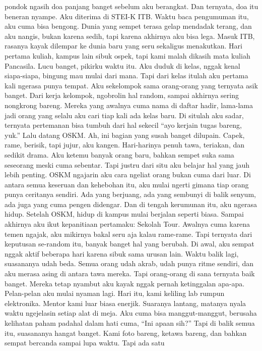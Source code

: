 \documentclass[
  letterpaper,
  DIV=11,
  numbers=noendperiod]{scrreprt}
\begin{document}
pondok ngasih doa panjang banget sebelum aku berangkat. Dan ternyata,
doa itu beneran nyampe. Aku diterima di STEI-K ITB. Waktu baca
pengumuman itu, aku cuma bisa bengong. Dunia yang sempet terasa gelap
mendadak terang, dan aku nangis, bukan karena sedih, tapi karena
akhirnya aku bisa lega. Masuk ITB, rasanya kayak dilempar ke dunia baru
yang seru sekaligus menakutkan. Hari pertama kuliah, kampus lain sibuk
ospek, tapi kami malah dikasih mata kuliah Pancasila. Lucu banget,
pikirku waktu itu. Aku duduk di kelas, nggak kenal siapa-siapa, bingung
mau mulai dari mana. Tapi dari kelas itulah aku pertama kali ngerasa
punya tempat. Aku sekelompok sama orang-orang yang ternyata asik banget.
Dari kerja kelompok, ngobrolin hal random, sampai akhirnya sering
nongkrong bareng. Mereka yang awalnya cuma nama di daftar hadir,
lama-lama jadi orang yang selalu aku cari tiap kali ada kelas baru. Di
situlah aku sadar, ternyata pertemanan bisa tumbuh dari hal sekecil
``ayo kerjain tugas bareng, yuk.'' Lalu datang OSKM. Ah, ini bagian yang
susah banget dilupain. Capek, rame, berisik, tapi jujur, aku kangen.
Hari-harinya penuh tawa, teriakan, dan sedikit drama. Aku ketemu banyak
orang baru, bahkan sempet suka sama seseorang meski cuma sebentar. Tapi
justru dari situ aku belajar hal yang jauh lebih penting. OSKM ngajarin
aku cara ngeliat orang bukan cuma dari luar. Di antara semua keseruan
dan kehebohan itu, aku mulai ngerti gimana tiap orang punya ceritanya
sendiri. Ada yang berjuang, ada yang sembunyi di balik senyum, ada juga
yang cuma pengen didengar. Dan di tengah kerumunan itu, aku ngerasa
hidup. Setelah OSKM, hidup di kampus mulai berjalan seperti biasa.
Sampai akhirnya aku ikut kepanitiaan pertamaku: Sekolah Tour. Awalnya
cuma karena temen ngajak, aku mikirnya bakal seru aja kalau rame-rame.
Tapi ternyata dari keputusan se-random itu, banyak banget hal yang
berubah. Di awal, aku sempat nggak aktif beberapa hari karena sibuk sama
urusan lain. Waktu balik lagi, suasananya udah beda. Semua orang udah
akrab, udah punya ritme sendiri, dan aku merasa asing di antara tawa
mereka. Tapi orang-orang di sana ternyata baik banget. Mereka tetap
nyambut aku kayak nggak pernah ketinggalan apa-apa. Pelan-pelan aku
mulai nyaman lagi. Hari itu, kami keliling lab rumpun elektronika.
Mentor kami luar biasa enerjik. Suaranya lantang, matanya nyala waktu
ngejelasin setiap alat di meja. Aku cuma bisa manggut-manggut, berusaha
kelihatan paham padahal dalam hati cuma, ``Ini apaan sih?'' Tapi di
balik semua itu, suasananya hangat banget. Kami foto bareng, ketawa
bareng, dan bahkan sempat bercanda sampai lupa waktu. Tapi ada satu
\end{document}

